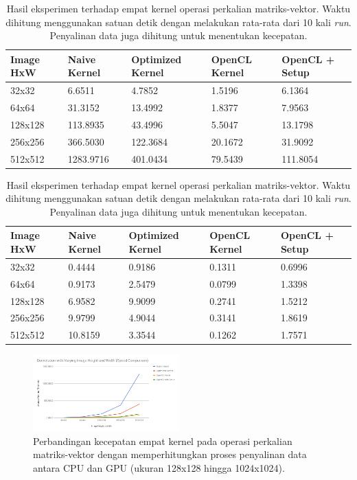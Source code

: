 \begin{table}
	\centering
	\caption{Hasil eksperimen terhadap empat kernel operasi perkalian matriks-vektor. Waktu dihitung menggunakan satuan detik dengan melakukan rata-rata dari 10 kali \textit{run}. Penyalinan data juga dihitung untuk menentukan kecepatan.}
	\label{tab:convvarhwspeed}
	\begin{tabular}{| R{2cm} | R{2cm} | R{2cm} | R{2cm} | R{2cm} |}
		\hline
		\textbf{Image HxW} & \textbf{Naive Kernel} & \textbf{Optimized Kernel} & \textbf{OpenCL Kernel} & \textbf{OpenCL + Setup} 
		\\
		\hline
		32x32 & 6.6511 & 4.7852 & 1.5196 & 6.1364
		\\
		\hline
		64x64 & 31.3152 & 13.4992 & 1.8377 & 7.9563
		\\
		\hline
		128x128 & 113.8935 & 43.4996 & 5.5047 & 13.1798
		\\
		\hline
		256x256 & 366.5030 & 122.3684 & 20.1672 & 31.9092
		\\
		\hline
		512x512 & 1283.9716 & 401.0434 & 79.5439 & 111.8054
		\\
		\hline
	\end{tabular}
\end{table}

\begin{table}
	\centering
	\caption{Hasil eksperimen terhadap empat kernel operasi perkalian matriks-vektor. Waktu dihitung menggunakan satuan detik dengan melakukan rata-rata dari 10 kali \textit{run}. Penyalinan data juga dihitung untuk menentukan kecepatan.}
	\label{tab:convvarhwdev}
	\begin{tabular}{| R{2cm} | R{2cm} | R{2cm} | R{2cm} | R{2cm} |}
		\hline
		\textbf{Image HxW} & \textbf{Naive Kernel} & \textbf{Optimized Kernel} & \textbf{OpenCL Kernel} & \textbf{OpenCL + Setup} 
		\\
		\hline
		32x32 & 0.4444 & 0.9186 & 0.1311 & 0.6996
		\\
		\hline
		64x64 & 0.9173 & 2.5479 & 0.0799 & 1.3398
		\\
		\hline
		128x128 & 6.9582 & 9.9099 & 0.2741 & 1.5212
		\\
		\hline
		256x256 & 9.9799 & 4.9044 & 0.3141 & 1.8619
		\\
		\hline
		512x512 & 10.8159 & 3.3544 & 0.1262 & 1.7571
		\\
		\hline
	\end{tabular}
\end{table}

\begin{figure}
	\centering
	\includegraphics[width=0.50\textwidth]
	{pics/convvarhw.png}
	\caption{Perbandingan kecepatan empat kernel pada operasi perkalian matriks-vektor dengan memperhitungkan proses penyalinan data antara CPU dan GPU (ukuran 128x128 hingga 1024x1024).}
	\label{fig:convvarhw}
\end{figure}

